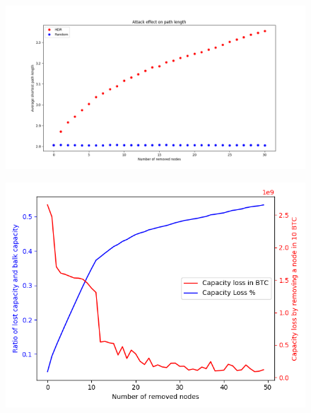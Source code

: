 \documentclass[runningheads]{llncs}
\begin{document}
\begin{figure}[h]
	\centering
	\begin{minipage}{.5\textwidth}
		\centering
		\includegraphics[width=\linewidth]{attackEffectPathLength.png}
		\label{fig:attackeffectpath}
	\end{minipage}%
	\begin{minipage}{.5\textwidth}
		\centering
		\includegraphics[width=\linewidth]{lostCapacity.png}
		\label{fig:lostCapacity}
	\end{minipage}
\end{figure}
\end{document}
